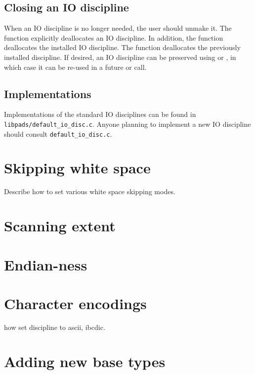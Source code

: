 \subsection{Closing an IO discipline}
When an IO discipline is no longer needed, the user should unmake it.
The function  explicitly deallocates an IO
discipline. In addition, the function 
deallocates the installed IO discipline.  
The function  deallocates the previously
installed discipline.
If desired, an IO discipline can be preserved using
 or , in
which case it can be re-used in a future  or
 call. 

\subsection{Implementations}
Implementations of the standard IO disciplines can be found in
\texttt{libpads/default\_io\_disc.c}.  Anyone planning to implement a new IO
discipline should consult \texttt{default\_io\_disc.c}.


\section{Skipping white space}
\label{sec:library-customization-white-space}
Describe how to set various white space skipping modes.

\section{Scanning extent}
\label{sec:library-customization-scanning-extent}

\section{Endian-ness}
\label{sec:library-customization-endian}

\section{Character encodings}
\label{sec:library-customization-character-encodings}
how set discipline to ascii, ibcdic.

\section{Adding new base types}
\label{sec:library-adding-new-base-types}
